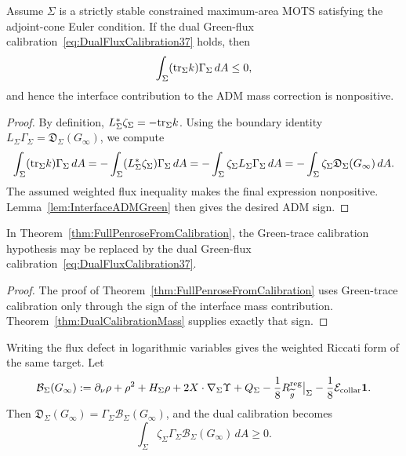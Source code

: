 \begin{theorem}\label{thm:DualCalibrationMass}
Assume \(\Sigma\) is a strictly stable constrained maximum-area MOTS satisfying the adjoint-cone Euler condition. If the dual Green-flux calibration~\eqref{eq:DualFluxCalibration37} holds, then
\[
    \int_\Sigma(\mathrm{tr}_\Sigma k)\Gamma_\Sigma\,dA\le0,
\]
and hence the interface contribution to the ADM mass correction is nonpositive.
\end{theorem}

\begin{proof}
By definition, \(L_\Sigma^*\zeta_\Sigma=-\mathrm{tr}_\Sigma k\). Using the boundary identity \(L_\Sigma\Gamma_\Sigma=\mathfrak D_\Sigma(G_\infty)\), we compute
\[
    \int_\Sigma(\mathrm{tr}_\Sigma k)\Gamma_\Sigma\,dA
    =
    -\int_\Sigma (L_\Sigma^*\zeta_\Sigma)\Gamma_\Sigma\,dA
    =
    -\int_\Sigma \zeta_\Sigma L_\Sigma\Gamma_\Sigma\,dA
    =
    -\int_\Sigma \zeta_\Sigma\mathfrak D_\Sigma(G_\infty)\,dA .
\]
The assumed weighted flux inequality makes the final expression nonpositive. Lemma~\ref{lem:InterfaceADMGreen} then gives the desired ADM sign.
\end{proof}

\begin{corollary}\label{cor:PenroseFromDualCalibration}
In Theorem~\ref{thm:FullPenroseFromCalibration}, the Green-trace calibration hypothesis may be replaced by the dual Green-flux calibration~\eqref{eq:DualFluxCalibration37}.
\end{corollary}

\begin{proof}
The proof of Theorem~\ref{thm:FullPenroseFromCalibration} uses Green-trace calibration only through the sign of the interface mass contribution. Theorem~\ref{thm:DualCalibrationMass} supplies exactly that sign.
\end{proof}

Writing the flux defect in logarithmic variables gives the weighted Riccati form of the same target. Let
\begin{equation}\label{eq:RiccatiBracket37}
    \mathcal B_\Sigma(G_\infty)
    :=
    \partial_\nu\rho+\rho^2+H_\Sigma\rho
    +2X\cdot\nabla_\Sigma\Upsilon
    +Q_\Sigma-\frac18 R_{\widetilde{g}}^{\mathrm{reg}}\big|_\Sigma
    -\frac18\mathcal E_{\mathrm{collar}}\mathbf 1 .
\end{equation}
Then \(\mathfrak D_\Sigma(G_\infty)=\Gamma_\Sigma\mathcal B_\Sigma(G_\infty)\), and the dual calibration becomes
\begin{equation}\label{eq:WeightedRiccati37}
    \int_\Sigma \zeta_\Sigma\Gamma_\Sigma
    \mathcal B_\Sigma(G_\infty)\,dA\ge0 .
\end{equation}

